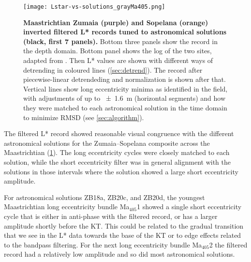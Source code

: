 \documentclass[]{agujournal2019}
\newcommand{\ma}[1]{Ma\(_{405}\)#1} %
\begin{document}
\begin{figure}
  \centering
  \texttt{[image: Lstar-vs-solutions\_grayMa405.png]}
  \caption{\label{fig:rolling-depth-age}
    \textbf{Maastrichtian Zumaia (purple) and Sopelana (orange) inverted filtered \gls{L*} records tuned to astronomical solutions (black, first 7 panels).}
    Bottom three panels show the record in the depth domain.
    Bottom panel shows the log of the two sites, adapted from .
    Then \gls{L*} values are shown with different ways of detrending in coloured lines (\cref{sec:detrend}).
    The record after piecewise-linear detrendeding and normalization is shown after that.
    Vertical lines show long eccentricity minima as identified in the field,
    with adjustments of up to \qty{\pm1.6}{\metre} (horizontal segments)
    and how they were matched to each astronomical solution in the time domain to minimize \gls{RMSD} (see \cref{sec:algorithm}).
    }
\end{figure}



The filtered \gls{L*} record showed reasonable visual congruence with the different astronomical solutions for the Zumaia--Sopelana composite across the Maastrichtian (\cref{fig:rolling-depth-age}). %
The long eccentricity cycles were closely matched to each solution, while the short eccentricity filter was in general alignment with the solutions in those intervals where the solution showed a large short eccentricity amplitude.

For astronomical solutions ZB18a, ZB20c, and ZB20d, the youngest Maastrichtian long eccentricity bundle \ma{1} showed a single short eccentricity cycle that is either in anti-phase with the filtered record, or has a larger amplitude shortly before the \gls{KT}.
This could be related to the gradual transition that we see in the \gls{L*} data towards the base of the \gls{KT} or to edge effects related to the bandpass filtering.
For the next long eccentricity bundle \ma{2} the filtered record had a relatively low amplitude and so did most astronomical solutions.
\end{document}
